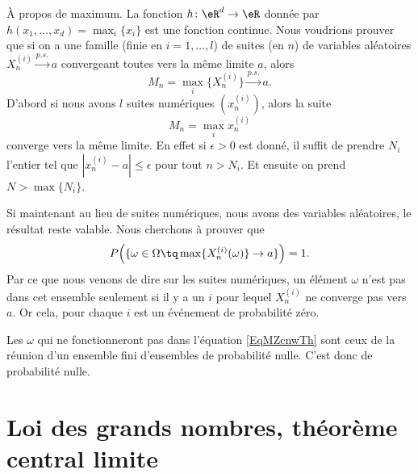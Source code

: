 \begin{example}		\label{EXooSRQUooWEpXRi}
	À propos de maximum. La fonction \( h\colon \eR^d\to \eR\) donnée par \( h(x_1,\ldots, x_d)=\max_i\{ x_i \}\) est une fonction continue. Nous voudrions prouver que si on a une famille (finie en \( i=1,\ldots, l\)) de suites (en \( n\)) de variables aléatoires \( X^{(i)}_n\stackrel{p.s.}{\longrightarrow} a\) convergeant toutes vers la même limite \( a\), alors
	\begin{equation}
		M_n=\max_i\{ X^{(i)}_n \}\stackrel{p.s.}{\longrightarrow} a.
	\end{equation}
	D'abord si nous avons \( l\) suites numériques \( (x^{(i)}_n)\), alors la suite
	\begin{equation}
		M_n=\max_ix_n^{(i)}
	\end{equation}
	converge vers la même limite. En effet si \( \epsilon>0\) est donné, il suffit de prendre \( N_i\) l'entier tel que \( | x^{(i)}_n-a |\leq \epsilon\) pour tout \( n>N_i\). Et ensuite on prend \( N>\max\{ N_i \}\).

	Si maintenant au lieu de suites numériques, nous avons des variables aléatoires, le résultat reste valable. Nous cherchons à prouver que
	\begin{equation}\label{EqMZcnwTh}
		P\Big( \{ \omega\in \Omega\tq \max\{ X^{(i)}_n(\omega) \}\to a \} \Big)=1.
	\end{equation}
	Par ce que nous venons de dire sur les suites numériques, un élément \( \omega\) n'est pas dans cet ensemble seulement si il y a un \( i\) pour lequel \( X^{(i)}_n\) ne converge pas vers \( a\). Or cela, pour chaque \( i\) est un événement de probabilité zéro.

	Les \( \omega\) qui ne fonctionneront pas dans l'équation \eqref{EqMZcnwTh} sont ceux de la réunion d'un ensemble fini d'ensembles de probabilité nulle. C'est donc de probabilité nulle.
\end{example}

\section{Loi des grands nombres, théorème central limite}

